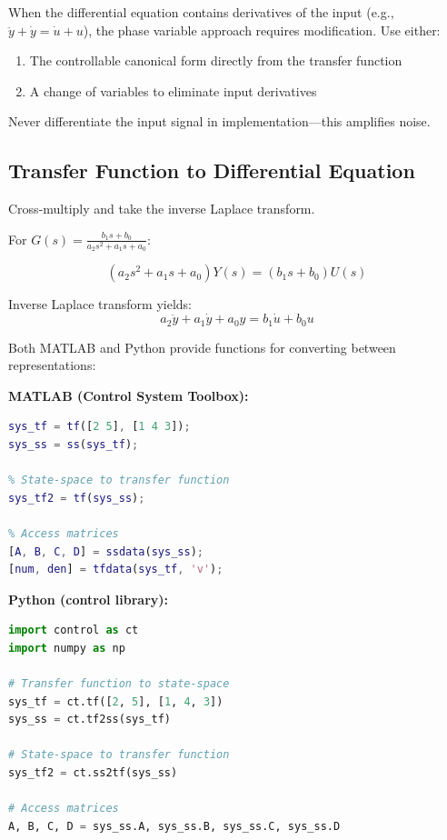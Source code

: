 \begin{warningbox}[title=Handling Input Derivatives]
When the differential equation contains derivatives of the input (e.g., $\ddot{y} + \dot{y} = \dot{u} + u$), the phase variable approach requires modification. Use either:
\begin{enumerate}
    \item The controllable canonical form directly from the transfer function
    \item A change of variables to eliminate input derivatives
\end{enumerate}
Never differentiate the input signal in implementation---this amplifies noise.
\end{warningbox}

\subsection{Transfer Function to Differential Equation}

Cross-multiply and take the inverse Laplace transform.

For $G(s) = \frac{b_1 s + b_0}{a_2 s^2 + a_1 s + a_0}$:

\begin{equation}
(a_2 s^2 + a_1 s + a_0)Y(s) = (b_1 s + b_0)U(s)
\end{equation}

Inverse Laplace transform yields:
\begin{equation}
a_2\ddot{y} + a_1\dot{y} + a_0 y = b_1\dot{u} + b_0 u
\end{equation}

\begin{practicalbox}[title=Software Tools for Model Conversion]
Both MATLAB and Python provide functions for converting between representations:

\textbf{MATLAB (Control System Toolbox):}
\begin{lstlisting}[language=Matlab,basicstyle=\ttfamily\footnotesize]
% Transfer function to state-space
sys_tf = tf([2 5], [1 4 3]);
sys_ss = ss(sys_tf);

% State-space to transfer function
sys_tf2 = tf(sys_ss);

% Access matrices
[A, B, C, D] = ssdata(sys_ss);
[num, den] = tfdata(sys_tf, 'v');
\end{lstlisting}

\textbf{Python (control library):}
\begin{lstlisting}[language=Python,basicstyle=\ttfamily\footnotesize]
import control as ct
import numpy as np

# Transfer function to state-space
sys_tf = ct.tf([2, 5], [1, 4, 3])
sys_ss = ct.tf2ss(sys_tf)

# State-space to transfer function
sys_tf2 = ct.ss2tf(sys_ss)

# Access matrices
A, B, C, D = sys_ss.A, sys_ss.B, sys_ss.C, sys_ss.D
\end{lstlisting}
\end{practicalbox}

